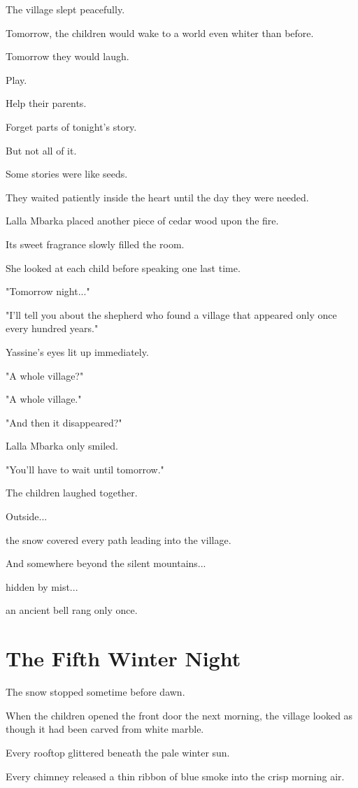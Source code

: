 \documentclass[12pt,openany]{book}
\begin{document}
The village slept peacefully.

Tomorrow, the children would wake to a world even whiter than before.

Tomorrow they would laugh.

Play.

Help their parents.

Forget parts of tonight's story.

But not all of it.

Some stories were like seeds.

They waited patiently inside the heart until the day they were needed.

Lalla Mbarka placed another piece of cedar wood upon the fire.

Its sweet fragrance slowly filled the room.

She looked at each child before speaking one last time.

"Tomorrow night..."

"I'll tell you about the shepherd who found a village that appeared only once every hundred years."

Yassine's eyes lit up immediately.

"A whole village?"

"A whole village."

"And then it disappeared?"

Lalla Mbarka only smiled.

"You'll have to wait until tomorrow."

The children laughed together.

Outside...

the snow covered every path leading into the village.

And somewhere beyond the silent mountains...

hidden by mist...

an ancient bell rang only once.
\chapter{The Fifth Winter Night}

The snow stopped sometime before dawn.

When the children opened the front door the next morning, the village looked as though it had been carved from white marble.

Every rooftop glittered beneath the pale winter sun.

Every chimney released a thin ribbon of blue smoke into the crisp morning air.
\end{document}
